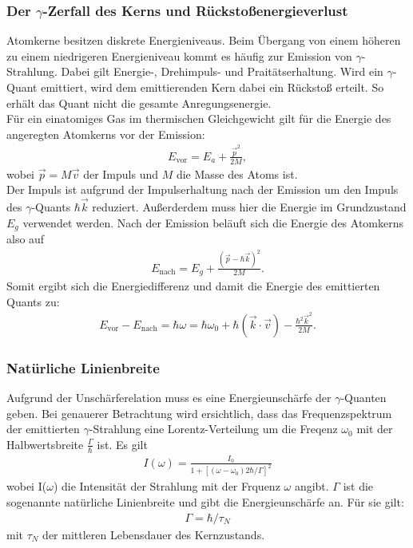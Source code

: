 \documentclass[a4paper,twoside,final]{article}
\begin{document}
\subsubsection{Der $\gamma$-Zerfall des Kerns und Rückstoßenergieverlust}\label{sec:Rückstoss}
Atomkerne besitzen diskrete Energieniveaus. Beim Übergang von einem höheren zu einem niedrigeren Energieniveau kommt es häufig zur Emission von $\gamma$-Strahlung. Dabei gilt Energie-, Drehimpuls- und Praitätserhaltung. Wird ein $\gamma$-Quant emittiert, wird dem emittierenden Kern dabei ein Rückstoß erteilt. So erhält das Quant nicht die gesamte Anregungsenergie. \\
Für ein einatomiges Gas im thermischen Gleichgewicht gilt für die Energie des angeregten Atomkerns vor der Emission:
\begin{align}
E_\text{vor} = E_a+\frac{\vec{p}^2}{2M},
\end{align}
wobei $\vec{p} = M\vec{v}$ der Impuls und $M$ die Masse des Atoms ist. \\
Der Impuls ist aufgrund der Impulserhaltung nach der Emission um den Impuls des $\gamma$-Quants $\hbar\vec{k}$ reduziert. Außerderdem muss hier die Energie im Grundzustand $E_g$ verwendet werden. Nach der Emission beläuft sich die Energie des Atomkerns also auf
\begin{align}
E_\text{nach} = E_g+\frac{(\vec{p}-\hbar\vec{k})^2}{2M}.
\end{align}
Somit ergibt sich die Energiedifferenz und damit die Energie des emittierten Quants zu:
\begin{align}\label{equ:EnergieGamma}
E_\text{vor}-E_\text{nach}= \hbar \omega = \hbar \omega_0 + \hbar (\vec{k}\cdot\vec{v})-\frac{\hbar^2\vec{k}^2}{2M}.
\end{align}

\subsubsection{Natürliche Linienbreite}
Aufgrund der Unschärferelation muss es eine Energieunschärfe der $\gamma$-Quanten geben. Bei genauerer Betrachtung wird ersichtlich, dass das Frequenzspektrum der emittierten $\gamma$-Strahlung eine Lorentz-Verteilung um die Freqenz $\omega_0$ mit der Halbwertsbreite $\frac{\Gamma}{\hbar}$ ist. Es gilt
\begin{align}
I(\omega) = \frac{I_0}{1+[(\omega-\omega_0)2\hbar/\Gamma]^2}
\end{align}
wobei I($\omega$) die Intensität der Strahlung mit der Frquenz $\omega$ angibt.
$\Gamma$ ist die sogenannte natürliche Linienbreite und gibt die Energieunschärfe an. Für sie gilt:
\begin{align}
\Gamma = \hbar / \tau_N
\end{align}
mit $\tau_N$ der mittleren Lebensdauer des Kernzustands.
\end{document}
